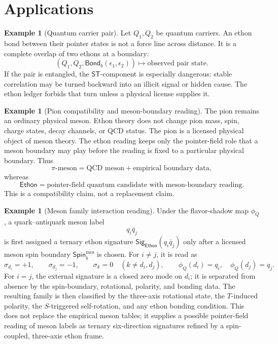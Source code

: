 \documentclass[11pt]{article}
\theoremstyle{definition}
\newtheorem{example}[definition]{Example}
\theoremstyle{plain}
\newcommand{\Eth}{\mathsf{Ethon}}
\newcommand{\ST}{\mathsf{ST}}
\newcommand{\Spin}{\mathsf{Spin}}
\newcommand{\Bond}{\mathsf{Bond}}
\newcommand{\Sig}{\mathsf{Sig}}
\begin{document}
\section{Applications}

\begin{example}[Quantum carrier pair]
Let \(Q_1,Q_2\) be quantum carriers.  An ethon bond between their pointer
states is not a force line across distance.  It is a complete overlap of
two ethons at a boundary:
\[
  (Q_1,Q_2,\Bond_b(\epsilon_1,\epsilon_2))
  \longmapsto
  \text{observed pair state}.
\]
If the pair is entangled, the \(\ST\)-component is especially dangerous:
stable correlation may be turned backward into an illicit signal or
hidden cause.  The ethon ledger forbids that turn unless a physical
license supplies it.
\end{example}

\begin{example}[Pion compatibility and meson-boundary reading]
The pion remains an ordinary physical meson.  Ethon theory does not
change pion mass, spin, charge states, decay channels, or QCD status.
The pion is a licensed physical object of meson theory.  The ethon
reading keeps only the pointer-field role that a meson boundary may play
before the reading is fixed to a particular physical boundary.  Thus
\[
  \pi\text{-meson}
  =
  \text{QCD meson}
  +
  \text{empirical boundary data},
\]
whereas
\[
  \Eth
  =
  \text{pointer-field quantum candidate with meson-boundary reading}.
\]
This is a compatibility claim, not a replacement claim.
\end{example}

\begin{example}[Meson family interaction reading]
Under the flavor-shadow map \(\phi_Q\), a quark--antiquark meson label
\[
  q_i\bar q_j
\]
is first assigned a ternary ethon signature
\(\Sig_{\Eth}(q_i\bar q_j)\) only after a licensed meson spin boundary
\(\Spin_b^{\mathrm{mes}}\) is chosen.  For \(i\neq j\), it is read as
\[
  \sigma_{d_i}=+1,\qquad
  \sigma_{d_j}=-1,\qquad
  \sigma_k=0\quad(k\neq d_i,d_j),
  \qquad
  \phi_Q(d_i)=q_i,\quad
  \phi_Q(d_j)=q_j.
\]
For \(i=j\), the external signature is a closed zero mode on \(d_i\); it
is separated from absence by the spin-boundary, rotational, polarity, and
bonding data.
The resulting family is then classified by the three-axis rotational
state, the \(T\)-induced polarity, the \(S\)-triggered self-rotation, and
any ethon bonding condition.  This does not replace the empirical meson
tables; it supplies a possible pointer-field reading of meson labels as
ternary six-direction signatures refined by a spin-coupled, three-axis
ethon frame.
\end{example}
\end{document}
